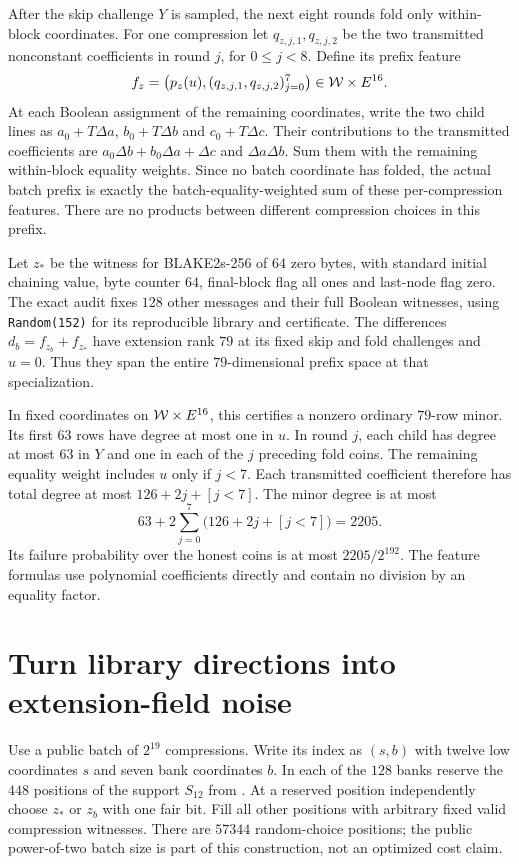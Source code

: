 \documentclass[11pt]{article}
\begin{document}
After the skip challenge $Y$ is sampled, the next eight rounds fold only within-block coordinates. For one compression let $q_{z,j,1},q_{z,j,2}$ be the two transmitted nonconstant coefficients in round $j$, for $0\le j<8$. Define its prefix feature
\[
 f_z=\bigl(p_z(u),(q_{z,j,1},q_{z,j,2})_{j=0}^7\bigr)
 \in\mathcal W\times E^{16}.
\]
At each Boolean assignment of the remaining coordinates, write the two child lines as $a_0+T\Delta a$, $b_0+T\Delta b$ and $c_0+T\Delta c$. Their contributions to the transmitted coefficients are $a_0\Delta b+b_0\Delta a+\Delta c$ and $\Delta a\Delta b$. Sum them with the remaining within-block equality weights. Since no batch coordinate has folded, the actual batch prefix is exactly the batch-equality-weighted sum of these per-compression features. There are no products between different compression choices in this prefix.

Let $z_*$ be the witness for BLAKE2s-256 of $64$ zero bytes, with standard initial chaining value, byte counter $64$, final-block flag all ones and last-node flag zero. The exact audit fixes $128$ other messages and their full Boolean witnesses, using \texttt{Random(152)} for its reproducible library and certificate. The differences $d_b=f_{z_b}+f_{z_*}$ have extension rank $79$ at its fixed skip and fold challenges and $u=0$. Thus they span the entire $79$-dimensional prefix space at that specialization.

In fixed coordinates on $\mathcal W\times E^{16}$, this certifies a nonzero ordinary $79$-row minor. Its first $63$ rows have degree at most one in $u$. In round $j$, each child has degree at most $63$ in $Y$ and one in each of the $j$ preceding fold coins. The remaining equality weight includes $u$ only if $j<7$. Each transmitted coefficient therefore has total degree at most $126+2j+[j<7]$. The minor degree is at most
\[
 63+2\sum_{j=0}^7\bigl(126+2j+[j<7]\bigr)=2205.
\]
Its failure probability over the honest coins is at most $2205/2^{192}$. The feature formulas use polynomial coefficients directly and contain no division by an equality factor.

\section{Turn library directions into extension-field noise}

Use a public batch of $2^{19}$ compressions. Write its index as $(s,b)$ with twelve low coordinates $s$ and seven bank coordinates $b$. In each of the $128$ banks reserve the $448$ positions of the support $S_{12}$ from . At a reserved position independently choose $z_*$ or $z_b$ with one fair bit. Fill all other positions with arbitrary fixed valid compression witnesses. There are $57344$ random-choice positions; the public power-of-two batch size is part of this construction, not an optimized cost claim.
\end{document}

